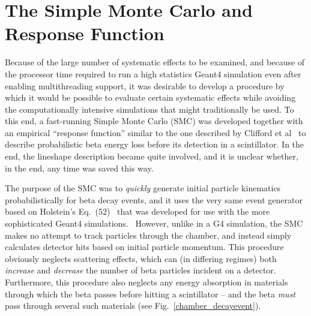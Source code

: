 

\section{The Simple Monte Carlo and Response Function}
\label{sec:responsefunction}
Because of the large number of systematic effects to be examined, and because of the processor time required to run a high statistics Geant4 simulation even after enabling multithreading support, it was desirable to develop a procedure by which it would be possible to evaluate certain systematic effects while avoiding the computationally intensive simulations that might traditionally be used.  To this end, a fast-running Simple Monte Carlo (SMC) was developed together with an empirical ``response function'' similar to the one described by Clifford et al~\cite{clifford} to describe probabilistic beta energy loss before its detection in a scintillator.  In the end, the lineshape description became quite involved, and it is unclear whether, in the end, any time was saved this way. 

The purpose of the SMC was to \emph{quickly} generate initial particle kinematics probabilistically for beta decay events, and it uses the very same event generator based on Holstein's Eq.~(52)~\cite{holstein} that was developed for use with the more sophisticated Geant4 simulations.~  However, unlike in a G4 simulation, the SMC makes no attempt to track particles through the chamber, and instead simply calculates detector hits based on initial particle momentum.  This procedure obviously neglects scattering effects, which can (in differing regimes) both \emph{increase} and \emph{decrease} the number of beta particles incident on a detector.  Furthermore, this procedure also neglects any energy absorption in materials through which the beta passes before hitting a scintillator -- and the beta \emph{must} pass through several such materials (see Fig.~\ref{chamber_decayevent}).

